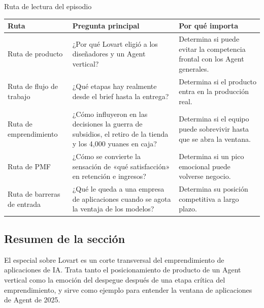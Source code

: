 \begin{knowledgebox}{Ruta de lectura del episodio}
\begin{tabularx}{\textwidth}{p{}p{}X}
\toprule
Ruta & Pregunta principal & Por qué importa \\
\midrule
Ruta de producto & ¿Por qué Lovart eligió a los diseñadores y un Agent vertical? & Determina si puede evitar la competencia frontal con los Agent generales. \\
Ruta de flujo de trabajo & ¿Qué etapas hay realmente desde el brief hasta la entrega? & Determina si el producto entra en la producción real. \\
Ruta de emprendimiento & ¿Cómo influyeron en las decisiones la guerra de subsidios, el retiro de la tienda y los 4,000 yuanes en caja? & Determina si el equipo puede sobrevivir hasta que se abra la ventana. \\
Ruta de PMF & ¿Cómo se convierte la sensación de «qué satisfacción» en retención e ingresos? & Determina si un pico emocional puede volverse negocio. \\
Ruta de barreras de entrada & ¿Qué le queda a una empresa de aplicaciones cuando se agota la ventaja de los modelos? & Determina su posición competitiva a largo plazo. \\
\bottomrule
\end{tabularx}
\end{knowledgebox}

\subsection{Resumen de la sección}

El especial sobre Lovart es un corte transversal del emprendimiento de aplicaciones de IA. Trata tanto el posicionamiento de producto de un Agent vertical como la emoción del despegue después de una etapa crítica del emprendimiento, y sirve como ejemplo para entender la ventana de aplicaciones de Agent de 2025.
